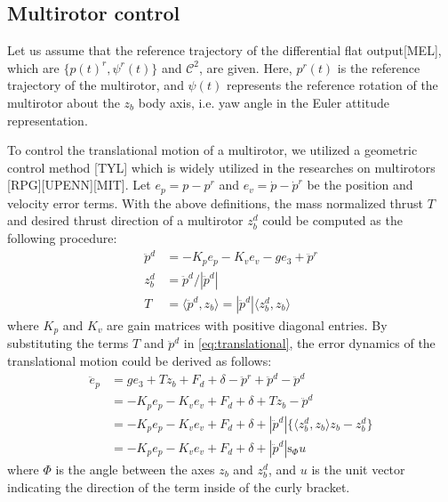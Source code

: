 \documentclass[letterpaper, 10 pt, conference]{ieeeconf}  %
\begin{document}
\subsection{Multirotor control} \label{sec:controller}
Let us assume that the reference trajectory of the differential flat output[MEL], which are $\{p(t)^r,\psi^r(t)\}$ and $\mathcal{C}^2$, are given.
Here, $p^r(t)$ is the reference trajectory of the multirotor, and $\psi(t)$ represents the reference rotation of the multirotor about the $z_b$ body axis, i.e. yaw angle in the Euler attitude representation.

To control the translational motion of a multirotor, we utilized a geometric control method [TYL] which is widely utilized in the researches on multirotors [RPG][UPENN][MIT].
Let $e_p = p - p^r$ and $e_v = \dot{p} - \dot{p}^r$ be the position and velocity error terms.
With the above definitions, the mass normalized thrust $T$ and desired thrust direction of a multirotor $z_b^d$ could be computed as the following procedure:
\begin{align}
\ddot{p}^{d} &= -K_p e_p - K_v e_v -ge_3 + \ddot{p}^r \label{eq:ddpd} \\
z_b^{d} &= \ddot{p}^{d}/|\ddot{p}^{d}| \nonumber \\
T &= \langle \ddot{p}^{d}, z_b \rangle = |\ddot{p}^{d}|\langle z_b^d, z_b \rangle \nonumber 
\end{align}
where $K_p$ and $K_v$ are gain matrices with positive diagonal entries.
By substituting the terms $T$ and $\ddot{p}^d$ in \eqref{eq:translational}, the error dynamics of the translational motion could be derived as follows:
\begin{align}
\ddot{e}_p &= ge_3 + Tz_b + F_d + \delta - \ddot{p}^r + \ddot{p}^d - \ddot{p}^d \nonumber \\
&= -K_pe_p -K_ve_v + F_d + \delta + Tz_b - \ddot{p}^d \nonumber \\
&= -K_pe_p -K_ve_v + F_d + \delta + |\ddot{p}^d|\{\langle z_b^d, z_b \rangle z_b - z_b^d\} \nonumber \\
&= -K_pe_p -K_ve_v + F_d + \delta +  |\ddot{p}^d|\text{s}_\Phi u \label{eq:translationalError1}
\end{align}
where $\Phi$ is the angle between the axes $z_b$ and $z_b^d$, and $u$ is the unit vector indicating the direction of the term inside of the curly bracket.
\end{document}
